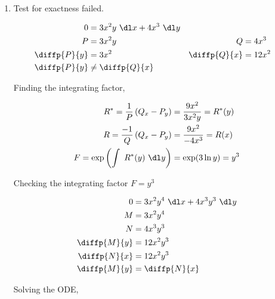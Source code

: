 \begin{enumerate}
\begin{enumerate}
              \item Test for exactness failed.

                    \begin{align}
                        0            & = 3x^{2}y\ \dl x + 4x^{3}\ \dl y                            \\
                        P            & = 3x^{2}y                        & Q            & = 4x^{3}  \\
                        \diffp{P}{y} & = 3x^{2}                         & \diffp{Q}{x} & = 12x^{2} \\
                        \diffp{P}{y} & \neq \diffp{Q}{x}
                    \end{align}

                    Finding the integrating factor,

                    \begin{align}
                        R^{*} = \frac{1}{P} \left( Q_{x} - P_{y} \right) & = \frac{9x^{2}}{3x^{2}y} = R^{*}(y) \\
                        R = \frac{-1}{Q}\left( Q_{x} - P_{y} \right)     & = \frac{9x^{2}}{-4x^{3}} = R(x)     \\
                        F = \exp \left( \int\ R^{*}(y)\ \dl y\right)     & = \exp (3\ln y) = y^{3}
                    \end{align}

                    Checking the integrating factor $ F = y^{3} $

                    \begin{align}
                        0            & = 3x^{2}y^{4}\ \dl x + 4x^{3}y^{3}\ \dl y \\
                        M            & = 3x^{2}y^{4}                             \\
                        N            & = 4x^{3}y^{3}                             \\
                        \diffp{M}{y} & = 12x^{2}y^{3}                            \\
                        \diffp{N}{x} & = 12x^{2}y^{3}                            \\
                        \diffp{M}{y} & = \diffp{N}{x}
                    \end{align}

                    Solving the ODE,


\end{enumerate}
\end{enumerate}
